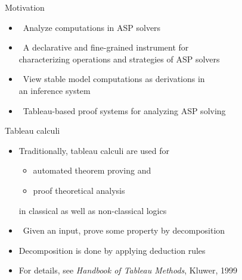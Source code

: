 \begin{frame}{Motivation}
  \bigskip
  \begin{itemize}
  \item<1->  \ Analyze computations in ASP solvers
    \smallskip
  \item<1->  \
    A declarative and fine-grained instrument for \\ characterizing
    operations and strategies of ASP solvers
    \bigskip
  \item<2->  \
    View stable model computations as derivations in\\ an inference system
  \item<3-> [] \itarrow\ \alert{Tableau-based proof systems} for analyzing ASP solving
\end{itemize}
\end{frame}
\begin{frame}{Tableau calculi}
  \bigskip
  \begin{itemize}
  \item Traditionally, tableau calculi are used for
    \begin{itemize}
    \item automated theorem proving and
    \item proof theoretical analysis
    \end{itemize}
    in classical as well as non-classical logics
    \medskip
  \item {} \ Given an input, prove some property by decomposition
  \item [] Decomposition is done by applying deduction rules \smallskip
  \item For details, see \emph{Handbook of Tableau Methods}, Kluwer, 1999 \cite{TableauHandbook}
  \end{itemize}
\end{frame}
